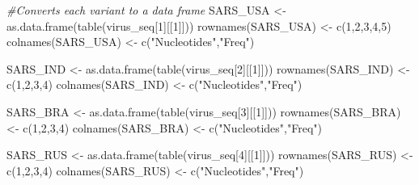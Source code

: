 \documentclass[
]{article}
\newenvironment{Shaded}{\begin{snugshade}}{\end{snugshade}}
\newcommand{\CommentTok}[1]{\textcolor[rgb]{0.56,0.35,0.01}{\textit{#1}}}
\newcommand{\DecValTok}[1]{\textcolor[rgb]{0.00,0.00,0.81}{#1}}
\newcommand{\FunctionTok}[1]{\textcolor[rgb]{0.00,0.00,0.00}{#1}}
\newcommand{\NormalTok}[1]{#1}
\newcommand{\OtherTok}[1]{\textcolor[rgb]{0.56,0.35,0.01}{#1}}
\newcommand{\StringTok}[1]{\textcolor[rgb]{0.31,0.60,0.02}{#1}}
\begin{document}
\begin{Shaded}
\begin{Highlighting}[]
\CommentTok{\#Converts each variant to a data frame}
\NormalTok{SARS\_USA }\OtherTok{\textless{}{-}} \FunctionTok{as.data.frame}\NormalTok{(}\FunctionTok{table}\NormalTok{(virus\_seq[}\DecValTok{1}\NormalTok{][[}\DecValTok{1}\NormalTok{]]))}
\FunctionTok{rownames}\NormalTok{(SARS\_USA) }\OtherTok{\textless{}{-}} \FunctionTok{c}\NormalTok{(}\DecValTok{1}\NormalTok{,}\DecValTok{2}\NormalTok{,}\DecValTok{3}\NormalTok{,}\DecValTok{4}\NormalTok{,}\DecValTok{5}\NormalTok{)}
\FunctionTok{colnames}\NormalTok{(SARS\_USA) }\OtherTok{\textless{}{-}} \FunctionTok{c}\NormalTok{(}\StringTok{"Nucleotides"}\NormalTok{,}\StringTok{"Freq"}\NormalTok{)}

\NormalTok{SARS\_IND }\OtherTok{\textless{}{-}} \FunctionTok{as.data.frame}\NormalTok{(}\FunctionTok{table}\NormalTok{(virus\_seq[}\DecValTok{2}\NormalTok{][[}\DecValTok{1}\NormalTok{]]))}
\FunctionTok{rownames}\NormalTok{(SARS\_IND) }\OtherTok{\textless{}{-}} \FunctionTok{c}\NormalTok{(}\DecValTok{1}\NormalTok{,}\DecValTok{2}\NormalTok{,}\DecValTok{3}\NormalTok{,}\DecValTok{4}\NormalTok{)}
\FunctionTok{colnames}\NormalTok{(SARS\_IND) }\OtherTok{\textless{}{-}} \FunctionTok{c}\NormalTok{(}\StringTok{"Nucleotides"}\NormalTok{,}\StringTok{"Freq"}\NormalTok{)}

\NormalTok{SARS\_BRA }\OtherTok{\textless{}{-}} \FunctionTok{as.data.frame}\NormalTok{(}\FunctionTok{table}\NormalTok{(virus\_seq[}\DecValTok{3}\NormalTok{][[}\DecValTok{1}\NormalTok{]]))}
\FunctionTok{rownames}\NormalTok{(SARS\_BRA) }\OtherTok{\textless{}{-}} \FunctionTok{c}\NormalTok{(}\DecValTok{1}\NormalTok{,}\DecValTok{2}\NormalTok{,}\DecValTok{3}\NormalTok{,}\DecValTok{4}\NormalTok{)}
\FunctionTok{colnames}\NormalTok{(SARS\_BRA) }\OtherTok{\textless{}{-}} \FunctionTok{c}\NormalTok{(}\StringTok{"Nucleotides"}\NormalTok{,}\StringTok{"Freq"}\NormalTok{)}

\NormalTok{SARS\_RUS }\OtherTok{\textless{}{-}} \FunctionTok{as.data.frame}\NormalTok{(}\FunctionTok{table}\NormalTok{(virus\_seq[}\DecValTok{4}\NormalTok{][[}\DecValTok{1}\NormalTok{]]))}
\FunctionTok{rownames}\NormalTok{(SARS\_RUS) }\OtherTok{\textless{}{-}} \FunctionTok{c}\NormalTok{(}\DecValTok{1}\NormalTok{,}\DecValTok{2}\NormalTok{,}\DecValTok{3}\NormalTok{,}\DecValTok{4}\NormalTok{)}
\FunctionTok{colnames}\NormalTok{(SARS\_RUS) }\OtherTok{\textless{}{-}} \FunctionTok{c}\NormalTok{(}\StringTok{"Nucleotides"}\NormalTok{,}\StringTok{"Freq"}\NormalTok{)}


\end{Highlighting}
\end{Shaded}
\end{document}
